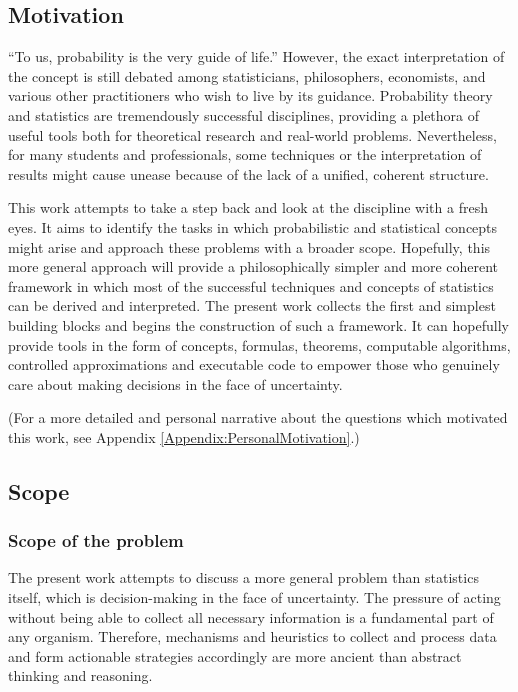 \documentclass{article}
\theoremstyle{definition}
\begin{document}
\subsection{Motivation}

``To us, probability is the very guide of life.'' \cite{book:Butler}
However, the exact interpretation of the concept is still debated among statisticians, philosophers, economists, and various other practitioners who wish to live by its guidance.
Probability theory and statistics are tremendously successful disciplines, providing a plethora of useful tools both for theoretical research and real-world problems.
Nevertheless, for many students and professionals, some techniques or the interpretation of results might cause unease because of the lack of a unified, coherent structure.

This work attempts to take a step back and look at the discipline with a fresh eyes.
It aims to identify the tasks in which probabilistic and statistical concepts might arise and approach these problems with a broader scope.
Hopefully, this more general approach will provide a philosophically simpler and more coherent framework in which most of the successful techniques and concepts of statistics can be derived and interpreted.
The present work collects the first and simplest building blocks and begins the construction of such a framework. It can hopefully provide tools in the form of concepts, formulas, theorems, computable algorithms, controlled approximations and executable code to empower those who genuinely care about making decisions in the face of uncertainty.

(For a more detailed and personal narrative about the questions which motivated this work, see Appendix \ref{Appendix:PersonalMotivation}.)

\subsection{Scope}

\subsubsection{Scope of the problem}

The present work attempts to discuss a more general problem than statistics itself, which is decision-making in the face of uncertainty.
The pressure of acting without being able to collect all necessary information is a fundamental part of any organism. Therefore, mechanisms and heuristics to collect and process data and form  actionable strategies accordingly are more ancient than abstract thinking and reasoning. \cite{book:EvolutionCognition}
\end{document}

